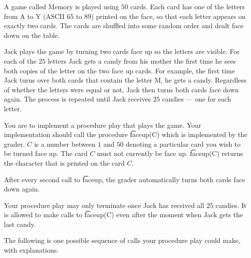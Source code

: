 A game called Memory is played using $50$ cards. Each card has one of the letters from A to Y (ASCII $65$ to $89$) printed on the face, so that each letter appears on
exactly two cards. The cards are shuffled into some random order and dealt face down on the table.

Jack plays the game by turning two cards face up so the letters are visible. For each of
the $25$ letters Jack gets a candy from his mother the first time he sees both copies of
the letter on the two face up cards. For example, the first time Jack turns over both
cards that contain the letter M, he gets a candy. Regardless of whether the letters were
equal or not, Jack then turns both cards face down again. The process is repeated until
Jack receives $25$ candies --- one for each letter.

You are to implement a procedure play that plays the game. Your implementation
should call the procedure \t{faceup(C)} which is implemented by the grader. $C$ is a
number between $1$ and $50$ denoting a particular card you wish to be turned face up.
The card $C$ must not currently be face up. \t{faceup(C)} returns the character that is printed on the card $C$.

After every second call to \t{faceup}, the grader automatically turns both cards face down
again.

Your procedure play may only terminate once Jack has received all $25$ candies. It is
allowed to make calls to \t{faceup(C)} even after the moment when Jack gets the last
candy.

The following is one possible sequence of calls your procedure play could make, with
explanations.

